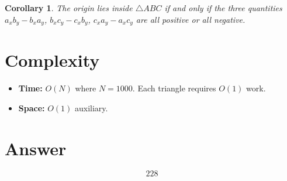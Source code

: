 \documentclass[12pt]{article}
\newtheorem{corollary}[theorem]{Corollary}
\begin{document}
\begin{corollary}
The origin lies inside $\triangle ABC$ if and only if the three quantities $a_x b_y - b_x a_y$, $b_x c_y - c_x b_y$, $c_x a_y - a_x c_y$ are all positive or all negative.
\end{corollary}

\section{Complexity}

\begin{itemize}
\item \textbf{Time:} $O(N)$ where $N = 1000$. Each triangle requires $O(1)$ work.
\item \textbf{Space:} $O(1)$ auxiliary.
\end{itemize}

\section{Answer}

\[
\boxed{228}
\]
\end{document}
